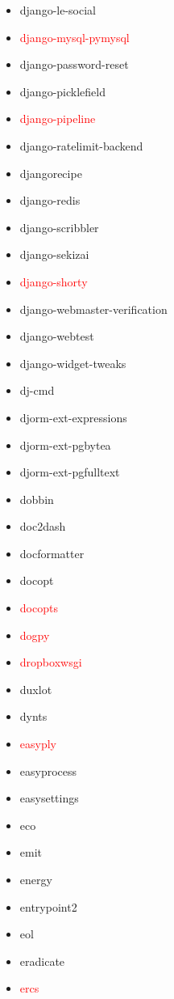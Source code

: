 \documentclass{l4proj}
\begin{document}
\begin{appendices}
{\begin{itemize}
\item django-le-social
\item\textcolor{red}{django-mysql-pymysql}
\item django-password-reset
\end{itemize}
}%
\noindent\parbox[t]{0.32\textwidth}{\raggedright%
\begin{itemize}
\item django-picklefield
\item\textcolor{red}{django-pipeline}
\item django-ratelimit-backend
\item djangorecipe
\item django-redis
\item django-scribbler
\item django-sekizai
\item\textcolor{red}{django-shorty}
\item django-webmaster-verification
\item django-webtest
\item django-widget-tweaks
\item dj-cmd
\item djorm-ext-expressions
\item djorm-ext-pgbytea
\item djorm-ext-pgfulltext
\item dobbin
\item doc2dash
\item docformatter
\item docopt
\item\textcolor{red}{docopts}
\item\textcolor{red}{dogpy}
\item\textcolor{red}{dropboxwsgi}
\item duxlot
\item dynts
\item\textcolor{red}{easyply}
\item easyprocess
\item easysettings
\item eco
\end{itemize}
}%
\clearpage
\noindent\parbox[t]{0.32\textwidth}{\raggedright%
\begin{itemize}
\item emit
\item energy
\item entrypoint2
\item eol
\item eradicate
\item\textcolor{red}{ercs}

\end{itemize}}
\end{appendices}
\end{document}
